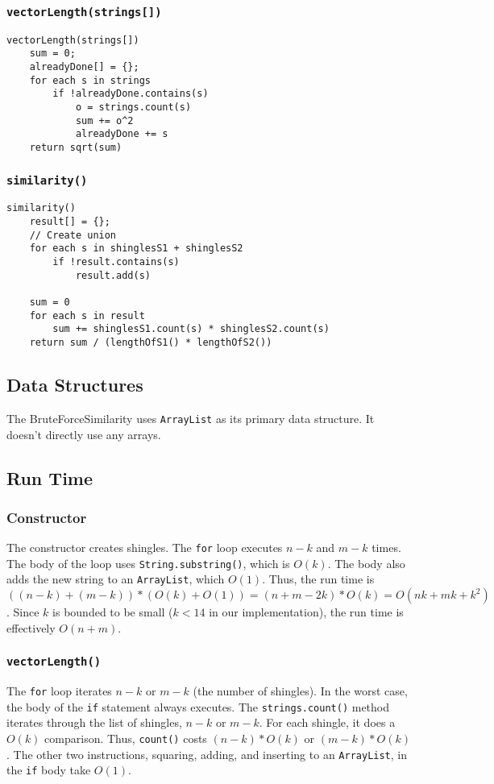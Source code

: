 \documentclass[10pt,letterpaper]{article}
\begin{document}
\subsubsection{\texttt{vectorLength(strings[])}}
\begin{verbatim}
vectorLength(strings[])
    sum = 0;
    alreadyDone[] = {};
    for each s in strings
        if !alreadyDone.contains(s)
            o = strings.count(s)
            sum += o^2
            alreadyDone += s
    return sqrt(sum)
\end{verbatim}
\subsubsection{\texttt{similarity()}}
\begin{verbatim}
similarity()
    result[] = {};
    // Create union
    for each s in shinglesS1 + shinglesS2
        if !result.contains(s)
            result.add(s)

    sum = 0
    for each s in result
        sum += shinglesS1.count(s) * shinglesS2.count(s)
    return sum / (lengthOfS1() * lengthOfS2())
\end{verbatim}
\subsection{Data Structures}
The BruteForceSimilarity uses \texttt{ArrayList} as its primary data structure. It doesn't directly use any arrays.
\subsection{Run Time}
\subsubsection{Constructor}
The constructor creates shingles. The \texttt{for} loop executes $n-k$ and $m-k$ times.
The body of the loop uses \texttt{String.substring()}, which is $O(k)$.
The body also adds the new string to an \texttt{ArrayList}, which $O(1)$.
Thus, the run time is $((n-k)+(m-k))*(O(k)+O(1))=(n+m-2k)*O(k)=O(nk+mk+k^2)$.
Since $k$ is bounded to be small ($k<14$ in our implementation), the run time is
effectively $O(n+m)$.
\subsubsection{\texttt{vectorLength()}}
The \texttt{for} loop iterates $n-k$ or $m-k$ (the number of shingles).
In the worst case, the body of the \texttt{if} statement always executes.
The \texttt{strings.count()} method iterates through the list of shingles, $n-k$ or $m-k$.
For each shingle, it does a $O(k)$ comparison. Thus, \texttt{count()} costs
$(n-k)*O(k)$ or $(m-k)*O(k)$. The other two instructions, squaring, adding,
and inserting to an \texttt{ArrayList}, in the \texttt{if} body take $O(1)$.
\end{document}
